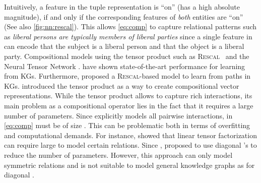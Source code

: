 \documentclass[letterpaper]{article}
\newcommand{\rescal}{\textsc{Rescal}\xspace}
\begin{document}
Intuitively, a feature in the tuple representation  is ``on''
(has a high absolute magnitude), if and only if the corresponding features
of \emph{both} entities are ``on'' (See also \cref{fig:nn:rescal}). 
This allows \cref{eq:comp} to capture relational patterns such as 
\emph{liberal persons are typically members of liberal parties} since 
a single feature in  can encode that the subject is a 
liberal person and that the object is a liberal party.
Compositional models using the tensor product 
such as \rescal~\citep{nickel_three-way_2011}
and the Neural Tensor Network \citep{socher2013reasoning}.
have shown state-of-the-art performance for learning from KGs.
Furthermore, \citet{guu2015traversing} proposed a \textsc{Rescal}-based model to learn from paths in KGs.
\citet{smolensky_tensor_1990} introduced 
the tensor product as a way to create compositional vector representations.
While the tensor product allows to capture rich interactions, its main problem
as a compositional operator lies in the fact that it requires a large number of
parameters. Since  explicitly models all pairwise interactions,
 in \cref{eq:comp} must be of size . This can be problematic both in
terms of overfitting and computational demands. For instance,
\citet{nickel2014reducing} showed that linear tensor factorization can require
large  to model certain relations. Since , \citet{yang2015embedding} proposed to
use diagonal 's to reduce the number of parameters. However, this approach
can only model symmetric relations and is not suitable to model general
knowledge graphs as  for
diagonal .
\end{document}
